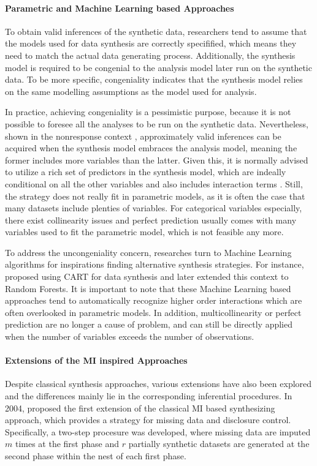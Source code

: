 \paragraph{Parametric and Machine Learning based Approaches}
To obtain valid inferences of the synthetic data, researchers tend to assume that the models used for data synthesis are correctly specifified, which means they need to match the actual data 
generating process. Additionally, the synthesis model is required to be congenial to the analysis model later run on the synthetic data. To be more specific, congeniality \citep{meng1994multiple} indicates that the synthesis model
relies on the same modelling assumptions as the model used for analysis.

In practice, achieving congeniality is a pessimistic purpose, because it is not possible to foresee all the analyses to be run on the synthetic data. Nevertheless, shown in the nonresponse context \citep{meng1994multiple},
approximately valid inferences can be acquired when the synthesis model embraces the analysis model, meaning the former includes more variables than the latter. Given this, it is normally advised to utilize a rich set of predictors in the synthesis model,
which are indeally conditional on all the other variables and also includes interaction terms \citep{little1997should}. Still, the strategy does not really fit in parametric models, as it is often the case that many datasets include plenties of variables.
For categorical variables especially, there exist collinearity issues and perfect prediction usually comes with many variables used to fit the parametric model, which is not feasible any more. 

To address the uncongeniality concern, researches turn to Machine Learning algorithms for inspirations finding alternative synthesis strategies. For instance, \citet{reiter2005using} proposed using CART for data synthesis and later \citet{caiola2010random} extended this context to
Random Forests. It is important to note that these Machine Learning based approaches tend to automatically recognize higher order interactions which are often overlooked in parametric models.
In addition, multicollinearity or perfect prediction are no longer a cause of problem, and can still be directly applied when the number of variables exceeds the number of observations.

\paragraph{Extensions of the MI inspired Approaches}
Despite classical synthesis approaches, various extensions have also been explored and the differences mainly lie in the corresponding inferential procedures. In 2004,  
\citet{reiter2004simultaneous} proposed the first extension of the classical MI based synthesizing approach, which provides a strategy for missing data and disclosure control. Specifically,
a two-step procesure was developed, where missing data are imputed $m$ times at the first phase and $r$ partially synthetic datasets are generated at the second phase within the nest of each
first phase.

